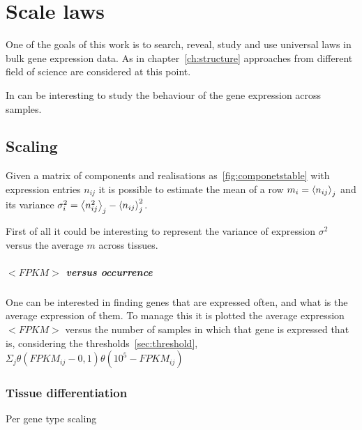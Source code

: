\chapter{Scale laws}\label{ch:scalelaws}
One of the goals of this work is to search, reveal, study and use universal laws in bulk gene expression data.\nocite{altmann2016statistical}
As in chapter~\ref{ch:structure} approaches from different field of science are considered at this point.

In can be interesting to study the behaviour of the gene expression across samples.

\section{Scaling}

Given a matrix of components and realisations as~\ref{fig:componetstable} with expression entries $n_{i j}$ it is possible to estimate the mean of a row $m_i=\left\langle n_{ij}\right\rangle_j$ and its variance $\sigma^2_i=\left\langle n_{ij}^2\right\rangle_j - \left\langle n_{ij}\right\rangle^2_j$.

First of all it could be interesting to represent the variance of expression $\sigma^2$ versus 
the average $m$ across tissues.





\paragraph{$<FPKM>$ versus occurrence}
One can be interested in finding genes that are expressed often, and what is the 
average expression of them.
To manage this it is plotted the average expression $<FPKM>$ versus the number 
of samples in which that gene is expressed that is, considering the thresholds~\ref{sec:threshold}, 
$\Sigma_j\theta (FPKM_{ij}-0,1)\theta (10^5-FPKM_{ij})$

\subsection{Tissue differentiation}
Per gene type scaling




